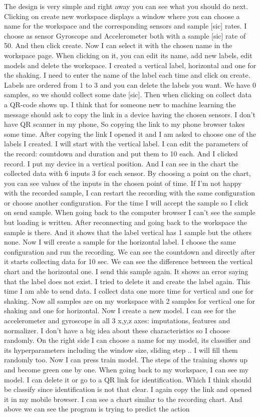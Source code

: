 The design is very simple and right away you can see what you should do next. Clicking on create new workspace displays a window where you can choose a name for the workspace and the corresponding sensors and sample [sic] rates. I choose as sensor Gyroscope and Accelerometer both with a sample [sic] rate of 50. And then click create. Now I can select it with the chosen name in the workspace page. When clicking on it, you can edit its name, add new labels, edit models and delete the workspace. I created a vertical label, horizontal and one for the shaking. I need to enter the name of the label each time and click on create. Labels are ordered from 1 to 3 and you can delete the labels you want. We have 0 samples, so we should collect some date [sic]. Then when clicking on collect data a QR-code shows up. I think that for someone new to machine learning the message should ask to copy the link in a device having the chosen sensors. I don't have QR scanner in my phone, So copying the link to my phone browser takes some time. After copying the link I opened it and I am asked to choose one of the labels I created. I will start with the vertical label. I can edit the parameters of the record: countdown and duration and put them to 10 each. And I clicked record. I put my device in a vertical position. And I can see in the chart the collected data with 6 inputs 3 for each sensor. By choosing a point on the chart, you can see values of the inputs in the chosen point of time. If I'm not happy with the recorded sample, I can restart the recording with the same configuration or choose another configuration. For the time I will accept the sample so I click on send sample. When going back to the computer browser I can't see the sample but loading is written. After reconnecting and going back to the workspace the sample is there. And it shows that the label vertical has 1 sample but the others none. Now I will create a sample for the horizontal label. I choose the same configuration and run the recording. We can see the countdown and directly after it starts collecting data for 10 sec. We can see the difference between the vertical chart and the horizontal one. I send this sample again. It shows an error saying that the label does not exist. I tried to delete it and create the label again. This time I am able to send data. I collect data one more time for vertical and one for shaking. Now all samples are on my workspace with 2 samples for vertical one for shaking and one for horizontal. Now I create a new model. I can see for the accelerometer and gyroscope in all 3 x,y,z axes: imputations, features and normalizer. I don't have a big idea about these characteristics so I choose randomly. On the right side I can choose a name for my model, its classifier and its hyperparameters including the window size, sliding step .. I will fill them randomly too. Now I can press train model. The steps of the training shows up and become green one by one. When going back to my workspace, I can see my model. I can delete it or go to a QR link for identification. Which I think should be classify since identification is not that clear. I again copy the link and opened it in my mobile browser. I can see a chart similar to the recording chart. And above we can see the program is trying to predict the action 